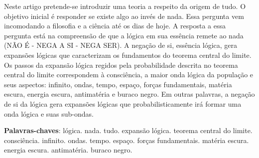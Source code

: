 \vspace{-20mm}
\maketitle
\vspace{-8mm}
\begin{resumoumacoluna}
\vspace{-2mm}
	Neste artigo pretende-se introduzir uma teoria a respeito da origem de tudo. O objetivo inicial é responder se existe algo ao invés de nada. Essa pergunta vem incomodando a filosofia e a ciência até os dias de hoje. A resposta a essa pergunta está na compreensão de que a lógica em sua essência remete ao nada (NÃO É - NEGA A SI - NEGA SER). A negação de si, essência lógica, gera expansões lógicas que caracterizam os fundamentos do teorema central do limite. Os passos da expansão lógica regidos pela probabilidade descrita no teorema central do limite correspondem à consciência, a maior onda lógica da população e seus aspectos: infinito, ondas, tempo, espaço, forças fundamentais, matéria escura, energia escura, antimatéria e buraco negro. Em outras palavras, a negação de si da lógica gera expansões lógicas que probabilisticamente irá formar uma onda lógica e suas sub-ondas. 
 \noindent
 
 \textbf{Palavras-chaves}: lógica. nada. tudo. expansão lógica. teorema central do limite. consciência. infinito. ondas. tempo. espaço. forças fundamentais. matéria escura. energia escura. antimatéria. buraco negro.
\end{resumoumacoluna}

